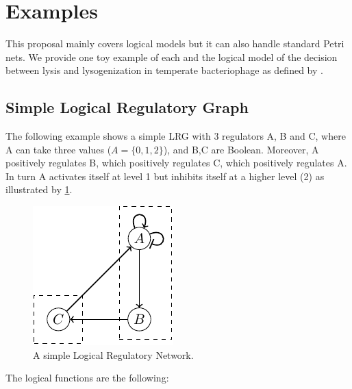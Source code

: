 
\section{Examples}
\label{examples}


This proposal mainly covers logical models but it can also handle standard Petri nets. We provide one toy example of each and the logical model of the decision between lysis and lysogenization in temperate bacteriophage as defined by \citet{thieffry95}.

\subsection{Simple Logical Regulatory Graph} %
\label{sub:lrg}
The following example shows a simple LRG with 3 regulators A, B and C, where A can take three values ($A=\{0,1,2\}$), and B,C are Boolean. Moreover, A positively regulates B, which positively regulates C, which positively regulates A. In turn A activates itself at level 1 but inhibits itself at a higher level (2) as illustrated by \ref{ex-lrg}.

\begin{figure}[hb]
  \includegraphics{figs/LRG.pdf}
  \caption{A simple Logical Regulatory Network.}
  \label{ex-lrg}
\end{figure}


The logical functions are the following:

\smallskip

